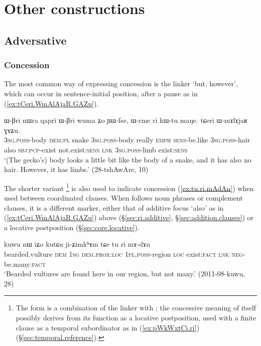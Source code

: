 \section{Other constructions}
 
\subsection{Adversative} \label{sec:adversative.clauses}

\subsubsection{Concession} \label{sec:concessive.clauses}
The most common way of expressing concession is the linker  `but, however', which can occur in sentence-initial position, after a pause as in (\ref{ex:tCeri.WmAlAjaR.GAZu}).

\begin{exe}
\ex \label{ex:tCeri.WmAlAjaR.GAZu}
\gll ɯ-βri nɯra qapri ɯ-βri wuma ʑo ɲɯ-fse, ɯ-rme ri kɯ-tu maŋe. tɕeri ɯ-mɤlɤjaʁ ɣɤʑu. \\
\textsc{3sg}.\textsc{poss}-body \textsc{dem}:\textsc{pl} snake \textsc{3sg}.\textsc{poss}-body really \textsc{emph} \textsc{sens}-be.like \textsc{3sg}.\textsc{poss}-hair also \textsc{sbj}:\textsc{pcp}-exist not.exist:\textsc{sens} \textsc{lnk} \textsc{3sg}.\textsc{poss}-limb exist:\textsc{sens} \\
\glt `(The gecko's) body looks a little bit like the body of a snake, and it has also no hair. However, it has limbs.' (28-tshAwAre, 10)
\end{exe}  

The shorter variant \footnote{The form  is a combination of the linker  with ; the concessive meaning of  itself possibly derives from its function as a locative postposition, used with a finite clause as a temporal subordinator as in (\ref{ex:pWkWxtCi.ri}) (§\ref{sec:temporal.reference}). } is also used to indicate concession (\ref{ex:tu.ri.mAdAn}) when used between coordinated clauses. When  follows noun phrases or complement clauses, it is a different marker, either that of additive focus `also' as in (\ref{ex:tCeri.WmAlAjaR.GAZu}) above (§\ref{sec:ri.additive}, §\ref{sec:addition.clauses}) or a locative postposition (§\ref{sec:core.locative}).

\begin{exe}
\ex \label{ex:tu.ri.mAdAn}
\gll kuwu nɯ iʑo kutɕu ji-ʑimkʰɤm tɕe tu ri mɤ-dɤn \\
bearded.vulture \textsc{dem} \textsc{1sg} \textsc{dem}.\textsc{prox}:\textsc{loc} \textsc{1pl}.\textsc{poss}-region \textsc{loc} exist:\textsc{fact} \textsc{lnk} \textsc{neg}-be.many:\textsc{fact} \\
\glt `Bearded vultures are found here in our region, but not many.' (2011-08-kuwu, 28)
\end{exe}  
 
